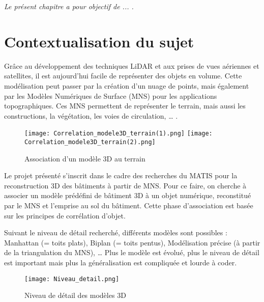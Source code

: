 
\textit{Le présent chapitre a pour objectif de ... . }

\section{Contextualisation du sujet}

Grâce au développement des techniques LiDAR et aux prises de vues aériennes et satellites, il est aujourd’hui facile de représenter des objets en volume. Cette modélisation peut passer par la création d’un nuage de points, mais également par les Modèles Numériques de Surface (MNS) pour les applications topographiques. Ces MNS permettent de représenter le terrain, mais aussi les constructions, la végétation, les voies de circulation, … .\newline

\begin{wrapfigure}[18]{r}{7cm}
	\texttt{[image: Correlation\_modele3D\_terrain(1).png]}
	\texttt{[image: Correlation\_modele3D\_terrain(2).png]}
	\caption{Association d'un modèle 3D au terrain}
	\label{Association d'un modèle 3D au terrain}
\end{wrapfigure}
Le projet présenté s’inscrit dans le cadre des recherches du MATIS pour la reconstruction 3D des bâtiments à partir de MNS. Pour ce faire, on cherche à associer un modèle prédéfini de bâtiment 3D à un objet numérique, reconstitué par le MNS et l’emprise au sol du bâtiment. Cette phase d’association est basée sur les principes de corrélation d’objet. \newline

Suivant le niveau de détail recherché, différents modèles sont possibles : Manhattan (= toits plats), Biplan (= toits pentus), Modélisation précise (à partir de la triangulation du MNS), … Plus le modèle est évolué, plus le niveau de détail est important mais plus la généralisation est compliquée et lourde à coder.\newline

\begin{figure}[!h]
	\begin{center}
		\texttt{[image: Niveau\_detail.png]}  \\
		\caption[Niveau de détail des modèles 3D]{Niveau de détail des modèles 3D}
		\label{fig:example}
	\end{center}
\end{figure}

